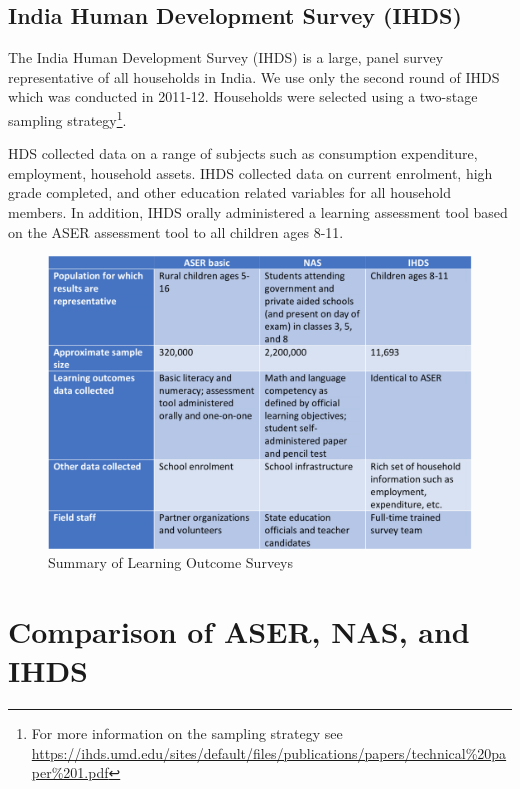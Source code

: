 \documentclass[
  11pt,
]{article}
\begin{document}
\hypertarget{india-human-development-survey-ihds}{%
\subsection{India Human Development Survey (IHDS)}\label{india-human-development-survey-ihds}}

The India Human Development Survey (IHDS) is a large, panel survey representative of all households in India. We use only the second round of IHDS which was conducted in 2011-12. Households were selected using a two-stage sampling strategy\footnote{For more information on the sampling strategy see
  \url{https://ihds.umd.edu/sites/default/files/publications/papers/technical\%20paper\%201.pdf}}.

HDS collected data on a range of subjects such as consumption expenditure, employment, household assets. IHDS collected data on current enrolment, high grade completed, and other education related variables for all household members. In addition, IHDS orally administered a learning assessment tool based on the ASER assessment tool to all children ages 8-11.

\begin{figure}

{\centering \includegraphics[width=0.8\linewidth]{summary_learning_outcomes} 

}

\caption{Summary of Learning Outcome Surveys}\label{fig:learningoutcomes}
\end{figure}

\hypertarget{comparison-of-aser-nas-and-ihds}{%
\section{Comparison of ASER, NAS, and IHDS}\label{comparison-of-aser-nas-and-ihds}}
\end{document}
